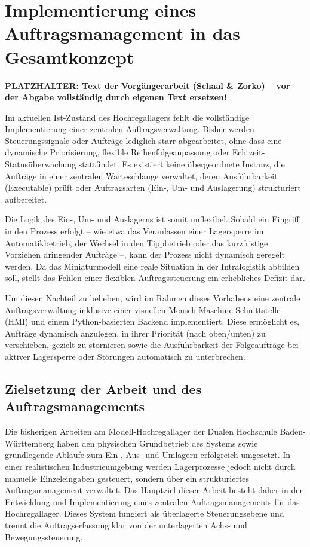 \section{Implementierung eines Auftragsmanagement in das Gesamtkonzept}

\noindent\colorbox{red!15}{\parbox{\dimexpr\textwidth-2\fboxsep}{\textbf{\color{red}PLATZHALTER: Text der Vorgängerarbeit (Schaal \& Zorko) – vor der Abgabe vollständig durch eigenen Text ersetzen!}}}


Im aktuellen Ist-Zustand des Hochregallagers fehlt die vollständige Implementierung einer zentralen Auftragsverwaltung. Bisher werden Steuerungssignale oder Aufträge lediglich starr abgearbeitet, ohne dass eine dynamische Priorisierung, flexible Reihenfolgeanpassung oder Echtzeit-Statusüberwachung stattfindet. Es existiert keine übergeordnete Instanz, die Aufträge in einer zentralen Warteschlange verwaltet, deren Ausführbarkeit (Executable) prüft oder Auftragsarten (Ein-, Um- und Auslagerung) strukturiert aufbereitet.

Die Logik des Ein-, Um- und Auslagerns ist somit unflexibel. Sobald ein Eingriff in den Prozess erfolgt – wie etwa das Veranlassen einer Lagersperre im Automatikbetrieb, der Wechsel in den Tippbetrieb oder das kurzfristige Vorziehen dringender Aufträge –, kann der Prozess nicht dynamisch geregelt werden. Da das Miniaturmodell eine reale Situation in der Intralogistik abbilden soll, stellt das Fehlen einer flexiblen Auftragssteuerung ein erhebliches Defizit dar.

Um diesen Nachteil zu beheben, wird im Rahmen dieses Vorhabens eine zentrale Auftragsverwaltung inklusive einer visuellen Mensch-Maschine-Schnittstelle (HMI) und einem Python-basierten Backend implementiert. Diese ermöglicht es, Aufträge dynamisch anzulegen, in ihrer Priorität (nach oben/unten) zu verschieben, gezielt zu stornieren sowie die Ausführbarkeit der Folgeaufträge bei aktiver Lagersperre oder Störungen automatisch zu unterbrechen.

\subsection{Zielsetzung der Arbeit und des Auftragsmanagements}

Die bisherigen Arbeiten am Modell-Hochregallager der Dualen Hochschule Baden-Württemberg haben den physischen Grundbetrieb des Systems sowie grundlegende Abläufe zum Ein-, Aus- und Umlagern erfolgreich umgesetzt. In einer realistischen Industrieumgebung werden Lagerprozesse jedoch nicht durch manuelle Einzeleingaben gesteuert, sondern über ein strukturiertes Auftragsmanagement verwaltet. Das Hauptziel dieser Arbeit besteht daher in der Entwicklung und Implementierung eines zentralen Auftragsmanagements für das Hochregallager. Dieses System fungiert als überlagerte Steuerungsebene und trennt die Auftragserfassung klar von der unterlagerten Achs- und Bewegungssteuerung.  

